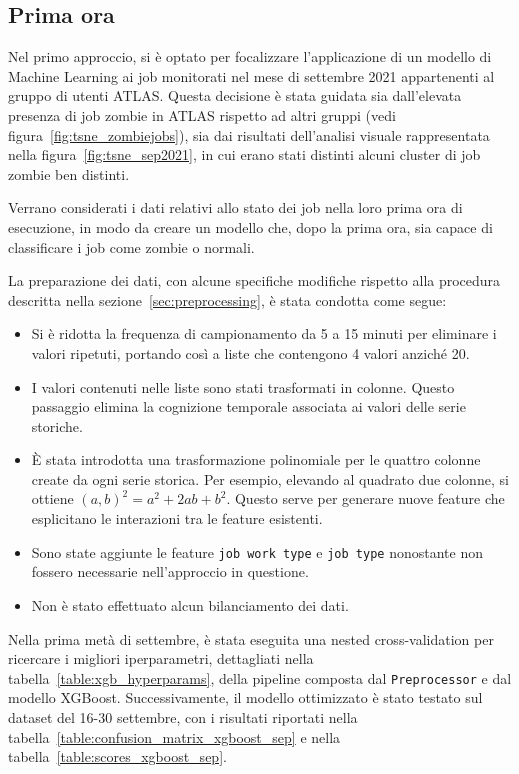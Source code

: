\subsection{Prima ora}

Nel primo approccio, si è optato per focalizzare l'applicazione di un modello
di Machine Learning ai job monitorati nel mese di settembre 2021 appartenenti
al gruppo di utenti ATLAS. Questa decisione è stata guidata sia dall'elevata
presenza di job zombie in ATLAS rispetto ad altri gruppi (vedi
figura~\ref{fig:tsne_zombiejobs}), sia dai risultati dell'analisi visuale
rappresentata nella figura~\ref{fig:tsne_sep2021}, in cui erano stati distinti
alcuni cluster di job zombie ben distinti. 

Verrano considerati i dati relativi allo stato dei job nella loro prima ora di
esecuzione, in modo da creare un modello che, dopo la prima ora, sia capace di
classificare i job come zombie o normali. 

La preparazione dei dati, con alcune specifiche modifiche rispetto alla
procedura descritta nella sezione~\ref{sec:preprocessing}, è stata condotta
come segue:

\begin{itemize}
    \item Si è ridotta la frequenza di campionamento da 5 a 15 minuti per
        eliminare i valori ripetuti, portando così a liste che contengono 4
        valori anziché 20.
    \item I valori contenuti nelle liste sono stati trasformati in colonne.
        Questo passaggio elimina la cognizione temporale associata ai valori
        delle serie storiche.
    \item È stata introdotta una trasformazione polinomiale per le quattro
        colonne create da ogni serie storica. Per esempio, elevando al
        quadrato due colonne, si ottiene $(a,b)^2=a^2+2ab+b^2$. Questo serve
        per generare nuove feature che esplicitano le interazioni tra le
        feature esistenti.
    \item Sono state aggiunte le feature \verb|job work type| e \verb|job type| 
        nonostante non fossero necessarie nell'approccio in questione.
    \item Non è stato effettuato alcun bilanciamento dei dati.
\end{itemize}

Nella prima metà di settembre, è stata eseguita una nested cross-validation
per ricercare i migliori iperparametri, dettagliati nella
tabella~\ref{table:xgb_hyperparams}, della pipeline composta dal
\texttt{Preprocessor} e dal modello XGBoost. Successivamente, il modello
ottimizzato è stato testato sul dataset del 16-30 settembre, con i risultati
riportati nella tabella~\ref{table:confusion_matrix_xgboost_sep} e nella
tabella~\ref{table:scores_xgboost_sep}.

